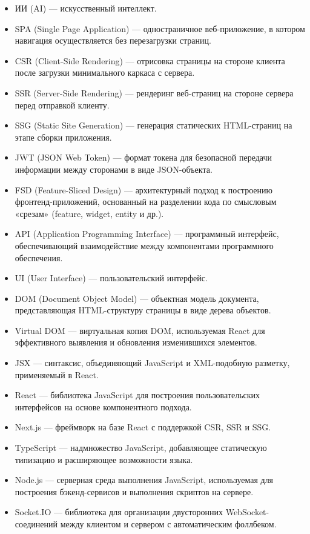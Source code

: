\begin{itemize}
  \item ИИ (AI) — искусственный интеллект.
  \item SPA (Single Page Application) — одностраничное веб-приложение, в котором навигация осуществляется без перезагрузки страниц.
  \item CSR (Client-Side Rendering) — отрисовка страницы на стороне клиента после загрузки минимального каркаса с сервера.
  \item SSR (Server-Side Rendering) — рендеринг веб-страниц на стороне сервера перед отправкой клиенту.
  \item SSG (Static Site Generation) — генерация статических HTML-страниц на этапе сборки приложения.
  \item JWT (JSON Web Token) — формат токена для безопасной передачи информации между сторонами в виде JSON-объекта.
  \item FSD (Feature-Sliced Design) — архитектурный подход к построению фронтенд-приложений, основанный на разделении кода по смысловым «срезам» (feature, widget, entity и др.).
  \item API (Application Programming Interface) — программный интерфейс, обеспечивающий взаимодействие между компонентами программного обеспечения.
  \item UI (User Interface) — пользовательский интерфейс.
  \item DOM (Document Object Model) — объектная модель документа, представляющая HTML-структуру страницы в виде дерева объектов.
  \item Virtual DOM — виртуальная копия DOM, используемая React для эффективного выявления и обновления изменившихся элементов.
  \item JSX — синтаксис, объединяющий JavaScript и XML-подобную разметку, применяемый в React.
  \item React — библиотека JavaScript для построения пользовательских интерфейсов на основе компонентного подхода.
  \item Next.js — фреймворк на базе React с поддержкой CSR, SSR и SSG.
  \item TypeScript — надмножество JavaScript, добавляющее статическую типизацию и расширяющее возможности языка.
  \item Node.js — серверная среда выполнения JavaScript, используемая для построения бэкенд-сервисов и выполнения скриптов на сервере.
  \item Socket.IO — библиотека для организации двусторонних WebSocket-соединений между клиентом и сервером с автоматическим фоллбеком.

\end{itemize}
